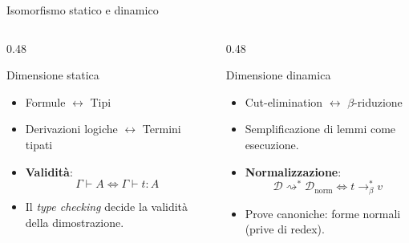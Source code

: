 \begin{frame}{Isomorfismo statico e dinamico}
    \begin{columns}[t, onlytextwidth]

        \begin{column}{0.48\textwidth}
            \begin{block}{Dimensione statica}
                \begin{minipage}[t][4.0cm][t]{\linewidth}
                    \begin{itemize}
                        \item Formule $\longleftrightarrow$ Tipi
                        \item Derivazioni logiche $\longleftrightarrow$ Termini tipati
                        \item \textbf{Validità}:
                        \vskip -0.15cm
                        \[
                            \Gamma \vdash A \iff \Gamma \vdash t : A
                        \]
                        \vskip -0.15cm
                        \item Il \emph{type checking} decide la validità della dimostrazione.
                    \end{itemize}
                \end{minipage}
            \end{block}
        \end{column}

        \begin{column}{0.48\textwidth}
            \begin{block}{Dimensione dinamica}
                \begin{minipage}[t][4.0cm][t]{\linewidth}
                    \begin{itemize}
                    \item Cut-elimination $\longleftrightarrow$ $\beta$-riduzione
                    \item Semplificazione di lemmi come esecuzione.
                    \item \textbf{Normalizzazione}:
                        \vskip -0.15cm
                        \[
                        \mathcal{D} \rightsquigarrow^* \mathcal{D}_{\text{norm}} \iff t \to_\beta^* v
                        \]
                        \vskip -0.15cm
                    \item Prove canoniche: forme normali (prive di redex).
                    \end{itemize}
                \end{minipage}
            \end{block}
        \end{column}
    \end{columns}
\end{frame}